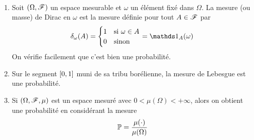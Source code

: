 \begin{exs}\,
    \begin{enumerate}
        \item Soit \((\Omega, \mathscr{F})\) un espace mesurable et
        \(\omega\) un élément fixé dans \(\Omega\). La mesure
        (ou masse) de Dirac en \(\omega\) est la mesure définie
        pour tout \(A\in\mathscr{F}\) par
        \begin{equation*}
            \delta_\omega(A) = \begin{cases}
                1 & \text{si } \omega\in A\\
                0 & \text{sinon}
            \end{cases}= \one_{A}(\omega)
        \end{equation*}
        On vérifie facilement que c'est bien une probabilité.

        \item Sur le segment \(\mathopen{}\left[0,1\right]\mathclose{}\) muni de sa tribu 
        borélienne, la mesure de Lebesgue est une probabilité.

        \item Si \((\Omega,\mathscr{F},\mu)\) est un espace mesuré avec
        \(0<\mu(\Omega)<+\infty\), alors on obtient une probabilité
        en considérant la mesure
        \begin{equation*}
            \mathbb{P} = \frac{\mu(\cdot)}{\mu(\Omega)}
        \end{equation*}
    \end{enumerate}
\end{exs}

